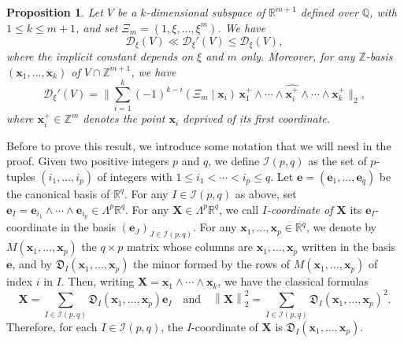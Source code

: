 \documentclass[JEP,XML,SOM,Unicode,NoFloatCountersInSection,published]{cedram}
\newcommand\sbw[2]{{{\mathsf{\Lambda}}^{{\!\scriptstyle#1}}{#2}}}
\newcommand\be{\boldsymbol{e}}
\newcommand\bx{\boldsymbol{x}}
\newcommand\bX{\boldsymbol{X}}
\newcommand\bQ{\mathbb{Q}}
\newcommand\bR{\mathbb{R}}
\newcommand\bZ{\mathbb{Z}}
\newcommand\cD{\mathfrak{D}}
\newcommand\cI{\mathcal{I}}
\newcommand\HHH{\mathcal{D}_\xi'}
\newcommand\HHstar{\mathcal{D}_{\xi}}
\newcommand{\norm}[1]{\left\|#1 \right\|_2}
\newcommand{\bnorm}[1]{\biggl\|#1 \biggr\|_2}
\newcommand{\psc}[2]{\left(#1 \mid #2\right)}
\newcommand\AND{\quad\text{and}\quad}
\theoremstyle{definition}
\theoremstyle{plain}
\newtheorem{Prop}[Def]{Proposition}
\begin{document}
\begin{Prop}
\label{Prop: annexe, formule HHH(V)}
Let $V$ be a $k$-dimensional subspace of $\bR^{m+1}$ defined over $\bQ$, with $1 \leq k\leq m+1$, and set $\Xi_m=(1,\xi,\dots,\xi^m)$. We have
\begin{equation}
\label{Prop annexe: equivalence estimate avec hauteur tordue}
\HHstar(V) \ll \HHH(V) \leq \HHstar(V),
\end{equation}
where the implicit constant depends on $\xi$ and $m$ only. Moreover, for any $\bZ$-basis $(\bx_1,\dots,\bx_k)$ of $V\cap\bZ^{m+1}$, we have
\begin{equation}
\label{eq prop: formule explicite HHH(V)}
\HHH(V) = \bnorm{\sum_{i=1}^{k} (-1)^{k-i}\psc{\Xi_m}{\bx_i}\,\bx_1^+\wedge \cdots \wedge\widehat{\bx_i^+}\wedge \cdots \wedge\bx_k^+},
\end{equation}
where $\bx_i^+\in\bZ^{m}$ denotes the point $\bx_i$ deprived of its first coordinate.
\end{Prop}

Before to prove this result, we introduce some notation that we will need in the proof. Given two positive integers $p$ and $q$, we define $\cI(p,q)$ as the set of $p$-tuples $(i_1,\dots,i_p)$ of integers with $1\leq i_1 < \cdots < i_p \leq q$. Let $\be = (\be_1,\dots,\be_q)$ be the canonical basis of $\bR^q$. For any $I\in\cI(p,q)$ as above, set $\be_{I} = \be_{i_1}\wedge \cdots \wedge \be_{i_p} \in \sbw{p}{\bR^q}$. For any $\bX\in\sbw{p}{\bR^q}$, we call \emph{$I$-coordinate of $\bX$} its $\be_I$-coordinate in the basis $(\be_J)_{J\in\cI(p,q)}$. For any $\bx_1,\dots,\bx_p\in\bR^q$, we denote by $M(\bx_1,\dots,\bx_p)$ the $q\times p$ matrix whose columns are $\bx_1,\dots, \bx_p$ written in the basis $\be$, and by $\cD_{I}(\bx_1,\dots,\bx_p)$ the minor formed by the rows of $M(\bx_1,\dots,\bx_p)$ of index $i$ in $I$. Then, writing $\bX = \bx_1\wedge \cdots \wedge\bx_k$, we have the classical formulas
\begin{equation}
\label{eq: formule norm multi-vecteur}
\bX = \sum_{I\in\cI(p,q)}\cD_{I}(\bx_1,\dots,\bx_p) \be_{I} \AND \norm{\bX}^2 = \sum_{I\in\cI(p,q)}\cD_{I}(\bx_1,\dots,\bx_p)^2.
\end{equation}
Therefore, for each $I\in\cI(p,q)$, the $I$-coordinate of $\bX$ is $\cD_{I}(\bx_1,\dots,\bx_p)$.
\end{document}
